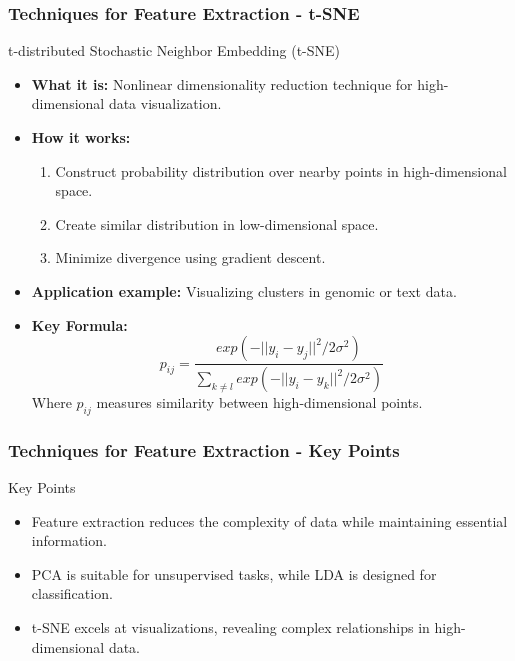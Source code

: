 \documentclass[aspectratio=169]{beamer}
\begin{document}
\begin{frame}[fragile]
    \frametitle{Techniques for Feature Extraction - t-SNE}
    \begin{block}{t-distributed Stochastic Neighbor Embedding (t-SNE)}
        \begin{itemize}
            \item \textbf{What it is:} Nonlinear dimensionality reduction technique for high-dimensional data visualization.
            \item \textbf{How it works:}
            \begin{enumerate}
                \item Construct probability distribution over nearby points in high-dimensional space.
                \item Create similar distribution in low-dimensional space.
                \item Minimize divergence using gradient descent.
            \end{enumerate}
            \item \textbf{Application example:} Visualizing clusters in genomic or text data.
            \item \textbf{Key Formula:} 
            \[
            p_{ij} = \frac{exp(-||y_i - y_j||^2 / 2\sigma^2)}{\sum_{k \neq l}exp(-||y_i - y_k||^2/2\sigma^2)}
            \]
            Where \( p_{ij} \) measures similarity between high-dimensional points.
        \end{itemize}
    \end{block}
\end{frame}

\begin{frame}[fragile]
    \frametitle{Techniques for Feature Extraction - Key Points}
    \begin{block}{Key Points}
        \begin{itemize}
            \item Feature extraction reduces the complexity of data while maintaining essential information.
            \item PCA is suitable for unsupervised tasks, while LDA is designed for classification.
            \item t-SNE excels at visualizations, revealing complex relationships in high-dimensional data.
        \end{itemize}
    \end{block}
\end{frame}
\end{document}
